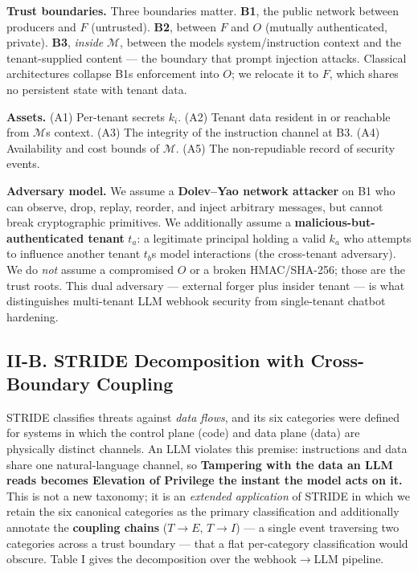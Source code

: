 \textbf{Trust boundaries.} Three boundaries matter. \textbf{B1}, the
public network between producers and \(F\) (untrusted). \textbf{B2},
between \(F\) and \(O\) (mutually authenticated, private). \textbf{B3},
\emph{inside} \(\mathcal{M}\), between the model\textquotesingle s
system/instruction context and the tenant-supplied content --- the
boundary that prompt injection attacks. Classical architectures collapse
B1\textquotesingle s enforcement into \(O\); we relocate it to \(F\),
which shares no persistent state with tenant data.

\textbf{Assets.} (A1) Per-tenant secrets \(k_i\). (A2) Tenant data
resident in or reachable from \(\mathcal{M}\)\textquotesingle s context.
(A3) The integrity of the instruction channel at B3. (A4) Availability
and cost bounds of \(\mathcal{M}\). (A5) The non-repudiable record of
security events.

\textbf{Adversary model.} We assume a \textbf{Dolev--Yao network
attacker} on B1 who can observe, drop, replay, reorder, and inject
arbitrary messages, but cannot break cryptographic primitives. We
additionally assume a \textbf{malicious-but-authenticated tenant}
\(t_a\): a legitimate principal holding a valid \(k_a\) who attempts to
influence another tenant \(t_b\)\textquotesingle s model interactions
(the cross-tenant adversary). We do \emph{not} assume a compromised
\(O\) or a broken HMAC/SHA-256; those are the trust roots. This dual
adversary --- external forger plus insider tenant --- is what
distinguishes multi-tenant LLM webhook security from single-tenant
chatbot hardening.

\subsection{II-B. STRIDE Decomposition with Cross-Boundary
Coupling}\label{ii-b-stride-decomposition-with-cross-boundary-coupling}

STRIDE classifies threats against \emph{data flows}, and its six
categories were defined for systems in which the control plane (code)
and data plane (data) are physically distinct channels. An LLM violates
this premise: instructions and data share one natural-language channel,
so \textbf{Tampering with the data an LLM reads becomes Elevation of
Privilege the instant the model acts on it.} This is not a new taxonomy;
it is an \emph{extended application} of STRIDE in which we retain the
six canonical categories as the primary classification and additionally
annotate the \textbf{coupling chains} (\(T\!\rightarrow\!E\),
\(T\!\rightarrow\!I\)) --- a single event traversing two categories
across a trust boundary --- that a flat per-category classification
would obscure. Table I gives the decomposition over the webhook$\to$LLM
pipeline.

